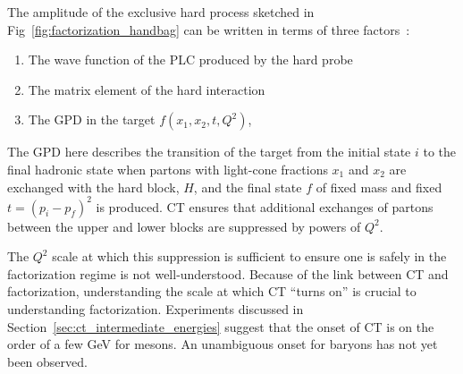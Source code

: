 The amplitude of the exclusive hard process sketched in
Fig~\ref{fig:factorization_handbag} can be written in terms of three
factors~\cite{Dutta_2012}:
\begin{enumerate}
    \item  The wave function of the PLC produced by the hard probe
    \item  The matrix element of the hard interaction
    \item  The GPD in the target $f(x_1,x_2,t,Q^2)$,
\end{enumerate}

The GPD here describes the transition of the target from the initial state $i$
to the final hadronic state when partons with light-cone fractions $x_1$ and
$x_2$ are exchanged with the hard block, $H$, and the final state $f$ of fixed
mass and fixed $t=(p_i-p_f)^2$ is produced.
CT ensures that additional exchanges of partons between the
upper and lower blocks are suppressed by powers of $Q^2$.


The $Q^2$ scale at which this suppression is sufficient to ensure one is
safely in the factorization regime is not well-understood.
Because of the link between CT and factorization, understanding the scale at
which CT ``turns on'' is crucial to understanding factorization.
Experiments discussed in Section~\ref{sec:ct_intermediate_energies} suggest
that the onset of CT is on the order of a few \si{\giga\electronvolt} for
mesons.
An unambiguous onset for baryons has not yet been observed.

